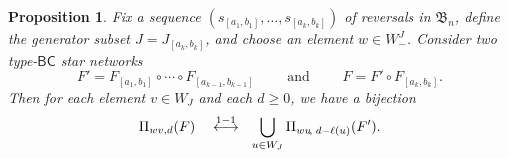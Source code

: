 \documentclass[12pt]{amsart}
\newtheorem{prop}[thm]{Proposition}
\theoremstyle{definition}
\numberwithin{equation}{section}
\newcommand{\bn}{\mathfrak{B}_n}
\newcommand{\mfb}[1]{\mathfrak{B}_{#1}}
\newcommand{\Wejm}{W^J_-}
\newcommand{\ntnsp}{\negthinspace}
\newcommand{\ntksp}{\negthickspace}
\newcommand{\msfBC}{\mathsf{BC}}
\begin{document}
\begin{prop}\label{p:BCbijectiontoshorterpathreversals}
  Fix a sequence $(s_{[a_1,b_1]}, \dotsc, s_{[a_{k},b_k]})$
  of reversals in $\bn$, define the generator subset $J 
  = J_{[a_k,b_k]}$,
  and choose an element $w \in \Wejm$.
  Consider two type-$\msfBC$ star networks
  \begin{equation*}
    F' = F_{[a_1,b_1]} \circ \cdots \circ F_{[a_{k-1}, b_{k-1}]}
    \qquad\text{ and }\qquad
    F = F' \circ F_{[a_k,b_k]}.
  \end{equation*}
  Then for each element $v \in W_J$ and each $d \geq 0$, we have a bijection
\begin{equation}\label{eq:BCbijectionsreversals}
\Pi_{wv,d}(F)
    \quad \overset{1-1}{\longleftrightarrow} \ \
    \bigcup_{u \in W_J} %
    \Pi_{wu\ntnsp,\; d-\ell(u)}(F').
\end{equation}
  \end{prop}
\end{document}
